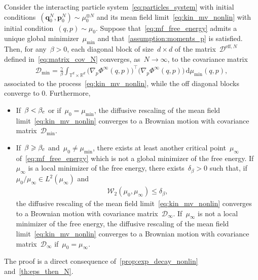 \documentclass[onefignum,onetabnum]{siamart251216} %
\renewcommand{\d}{\mathrm{d}}
\newcommand{\torus}{\mathbb T}
\newcommand{\real}{\mathbb R}
\newcommand{\mc}[1]{\mathcal{#1}}
\renewcommand{\leq}{\leqslant}
\renewcommand{\geq}{\geqslant}
\newcommand{\mescin}{\mu}
\newcommand{\DeffN}{\mc{D}^{\mathrm{eff},N}}
\newcommand{\vP}[1]{\mathbf{p}^{#1}}
\newcommand{\vQ}[1]{\mathbf{q}^{#1}}
\newcommand{\SolPois}{\Phi^\infty}
\theoremstyle{plain}
\numberwithin{equation}{section}
\numberwithin{theorem}{section}
\begin{document}
\begin{theorem}
    Consider the interacting particle system~\eqref{eq:particles_system} with initial conditions~$(\vQ{N}_0,\vP{N}_0) \sim \mescin_0^{\otimes N}$ and its mean field limit~\eqref{eq:kin_mv_nonlin} with initial condition~$(q,p) \sim\mescin_0$. Suppose that~\eqref{eq:mf_free_energy} admits a unique global minimizer~$\mescin_{\min}$ and that~\cref{assumption:moments_p} is satisfied. Then, for any~$\beta >0$, each diagonal block  of size~$d \times d$ of the matrix~$\DeffN$ defined in~\eqref{eq:matrix_cov_N} converges, as~$N\to \infty$, to the covariance matrix
        \begin{align*}
        \mc{D}_{\min}= \frac{\gamma}{\beta}\int_{\torus^d \times \real^d} \bigl(\nabla_p \SolPois(q,p)\bigr)^\top \bigl(\nabla_p \SolPois(q,p)\bigr)\, \d\mescin_{\min}(q,p),
        \end{align*}
        associated to the process~\eqref{eq:kin_mv_nonlin}, while the off diagonal blocks converge to 0. Furthermore,
    \begin{itemize}
        \item If~$\beta< \beta_{\rm c}$ or if~$\mescin_0 = \mescin_{\min}$, the diffusive rescaling of the mean field limit~\eqref{eq:kin_mv_nonlin} converges to a Brownian motion with covariance matrix~$\mc{D}_{\min}$.
        \item If~$\beta \geq \beta_{\rm c}$ and~$\mescin_0 \neq \mescin_{\min}$, there exists at least another critical point~$\mescin_{\infty}$ of~\eqref{eq:mf_free_energy} which is not a global minimizer of the free energy.  If~$\mescin_\infty$ is a local minimizer of the free energy, there exists~$\delta_\beta >0$ such that, if~$\mescin_0/\mescin_\infty\in L^2(\mescin_\infty)$ and
            \begin{align}
            \label{eq:ic_wasserstein_commutation}
            \mc{W}_2(\mescin_0,\mescin_\infty) \leq \delta_\beta,
            \end{align}
            the diffusive rescaling of the mean field limit~\eqref{eq:kin_mv_nonlin} converges to a Brownian motion with covariance matrix~$\mc{D}_\infty$. If~$\mescin_\infty$ is not a local minimizer of the free energy, the diffusive rescaling of the mean field limit~\eqref{eq:kin_mv_nonlin} converges to a Brownian motion with covariance matrix~$\mc{D}_\infty$ if~$\mescin_0 = \mescin_{\infty}$.
    \end{itemize}
\end{theorem}
The proof is a direct consequence of~\cref{prop:exp_decay_nonlin} and~\cref{th:eps_then_N}.
\end{document}
